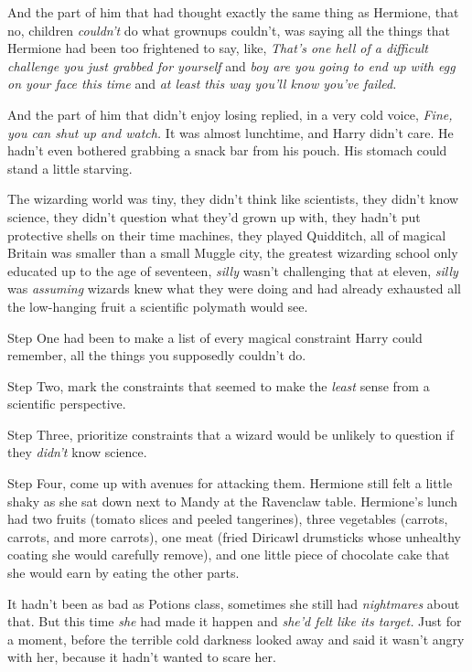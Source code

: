 And the part of him that had thought exactly the same thing as Hermione, that 
no, children \emph{couldn't} do what grownups couldn't, was saying all the 
things that Hermione had been too frightened to say, like, \emph{That's one 
hell of a difficult challenge you just grabbed for yourself} and \emph{boy are 
you going to end up with egg on your face this time} and \emph{at least this 
way you'll know you've failed.}

And the part of him that didn't enjoy losing replied, in a very cold voice, 
\emph{Fine, you can shut up and watch.}
\sbreak
It was almost lunchtime, and Harry didn't care. He hadn't even bothered 
grabbing a snack bar from his pouch. His stomach could stand a little starving.

The wizarding world was tiny, they didn't think like scientists, they didn't 
know science, they didn't question what they'd grown up with, they hadn't put 
protective shells on their time machines, they played Quidditch, all of magical 
Britain was smaller than a small Muggle city, the greatest wizarding school 
only educated up to the age of seventeen, \emph{silly} wasn't challenging that 
at eleven, \emph{silly} was \emph{assuming} wizards knew what they were doing 
and had already exhausted all the low-hanging fruit a scientific polymath would 
see.

Step One had been to make a list of every magical constraint Harry could 
remember, all the things you supposedly couldn't do.

Step Two, mark the constraints that seemed to make the \emph{least} sense from 
a scientific perspective.

Step Three, prioritize constraints that a wizard would be unlikely to question 
if they \emph{didn't} know science.

Step Four, come up with avenues for attacking them.
\sbreak
Hermione still felt a little shaky as she sat down next to Mandy at the 
Ravenclaw table. Hermione's lunch had two fruits (tomato slices and peeled 
tangerines), three vegetables (carrots, carrots, and more carrots), one meat 
(fried Diricawl drumsticks whose unhealthy coating she would carefully remove), 
and one little piece of chocolate cake that she would earn by eating the other 
parts.

It hadn't been as bad as Potions class, sometimes she still had 
\emph{nightmares} about that. But this time \emph{she} had made it happen and 
\emph{she'd felt like its target.} Just for a moment, before the terrible cold 
darkness looked away and said it wasn't angry with her, because it hadn't 
wanted to scare her.

